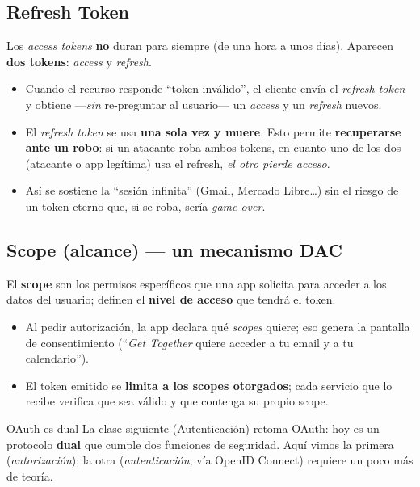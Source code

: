 \documentclass[11pt,a4paper]{article}
\begin{document}
\subsection{Refresh Token}
Los \emph{access tokens} \textbf{no} duran para siempre (de una hora a unos días). Aparecen
\textbf{dos tokens}: \emph{access} y \emph{refresh}.
\begin{itemize}[leftmargin=1.4em,itemsep=1pt]
  \item Cuando el recurso responde ``token inválido'', el cliente envía el \emph{refresh token}
        y obtiene —\emph{sin} re-preguntar al usuario— un \emph{access} y un \emph{refresh}
        nuevos.
  \item El \emph{refresh token} se usa \textbf{una sola vez y muere}. Esto permite
        \textbf{recuperarse ante un robo}: si un atacante roba ambos tokens, en cuanto uno de
        los dos (atacante o app legítima) usa el refresh, \emph{el otro pierde acceso}.
  \item Así se sostiene la ``sesión infinita'' (Gmail, Mercado Libre\dots) sin el riesgo de un
        token eterno que, si se roba, sería \emph{game over}.
\end{itemize}

\subsection{Scope (alcance) — un mecanismo DAC}
El \textbf{scope} son los permisos específicos que una app solicita para acceder a los datos
del usuario; definen el \textbf{nivel de acceso} que tendrá el token.
\begin{itemize}[leftmargin=1.4em,itemsep=1pt]
  \item Al pedir autorización, la app declara qué \emph{scopes} quiere; eso genera la pantalla
        de consentimiento (``\emph{Get Together} quiere acceder a tu email y a tu calendario'').
  \item El token emitido se \textbf{limita a los scopes otorgados}; cada servicio que lo recibe
        verifica que sea válido y que contenga su propio scope.
\end{itemize}

\begin{anecbox}{OAuth es dual}
La clase siguiente (Autenticación) retoma OAuth: hoy es un protocolo \textbf{dual} que cumple
dos funciones de seguridad. Aquí vimos la primera (\emph{autorización}); la otra
(\emph{autenticación}, vía OpenID Connect) requiere un poco más de teoría.
\end{anecbox}
\end{document}
